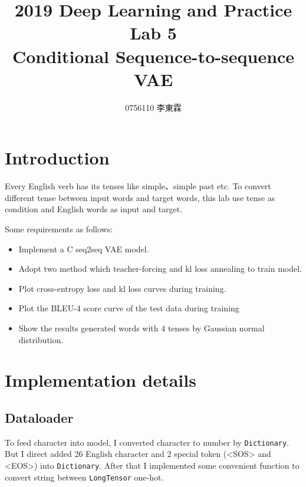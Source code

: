 \documentclass[12pt]{article}
\begin{document}
 
 
\title{2019 Deep Learning and Practice \\ Lab 5 \\ Conditional Sequence-to-sequence VAE}
\author{0756110 李東霖}

\maketitle
\section{Introduction}

Every English verb has its tenses like simple、simple past etc. To convert different tense between input words and target words, this lab use tense as condition and English words as input and target.

Some requirements as follows:

\begin{itemize}
\item Implement a C seq2seq VAE model.
\item Adopt two method which teacher-forcing and kl loss annealing to train model.
\item Plot cross-entropy loss and kl loss curves during training.
\item Plot the BLEU-4 score curve of the test data during training
\item Show the results generated words with 4 tenses by Gaussian normal distribution.
\end{itemize}

\section{Implementation details}

\subsection{Dataloader}

To feed character into model, I converted character to number by \verb|Dictionary|. But I direct added 26 English character and 2 special token (<SOS> and <EOS>) into \verb|Dictionary|. After that I implemented some convenient function to convert string between \verb|LongTensor| one-hot.
\end{document}
